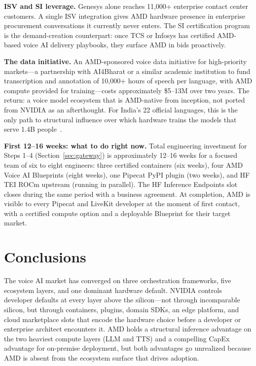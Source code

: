 \documentclass[blind]{gtac}
\begin{document}
\textbf{ISV and SI leverage.}
Genesys alone reaches 11,000+ enterprise contact center customers. A single ISV integration gives AMD hardware presence in enterprise procurement conversations it currently never enters. The SI certification program is the demand-creation counterpart: once TCS or Infosys has certified AMD-based voice AI delivery playbooks, they surface AMD in bids proactively.

\textbf{The data initiative.}
An AMD-sponsored voice data initiative for high-priority markets---a partnership with AI4Bharat or a similar academic institution to fund transcription and annotation of 10,000+ hours of speech per language, with AMD compute provided for training---costs approximately \$5--13M over two years. The return: a voice model ecosystem that is AMD-native from inception, not ported from NVIDIA as an afterthought. For India's 22 official languages, this is the only path to structural influence over which hardware trains the models that serve 1.4B people~\cite{indic_asr,sarvam_asr}.

\textbf{First 12--16 weeks: what to do right now.}
Total engineering investment for Steps 1--4 (Section~\ref{sec:gateway}) is approximately 12--16 weeks for a focused team of six to eight engineers: three certified containers (six weeks), four AMD Voice AI Blueprints (eight weeks), one Pipecat PyPI plugin (two weeks), and HF TEI ROCm upstream (running in parallel). The HF Inference Endpoints slot closes during the same period with a business agreement. At completion, AMD is visible to every Pipecat and LiveKit developer at the moment of first contact, with a certified compute option and a deployable Blueprint for their target market.

\section{Conclusions}
\label{sec:conclusions}

The voice AI market has converged on three orchestration frameworks, five ecosystem layers, and one dominant hardware default. NVIDIA controls developer defaults at every layer above the silicon---not through incomparable silicon, but through containers, plugins, domain SDKs, an edge platform, and cloud marketplace slots that encode the hardware choice before a developer or enterprise architect encounters it. AMD holds a structural inference advantage on the two heaviest compute layers (LLM and TTS) and a compelling CapEx advantage for on-premise deployment, but both advantages go unrealized because AMD is absent from the ecosystem surface that drives adoption.
\end{document}

